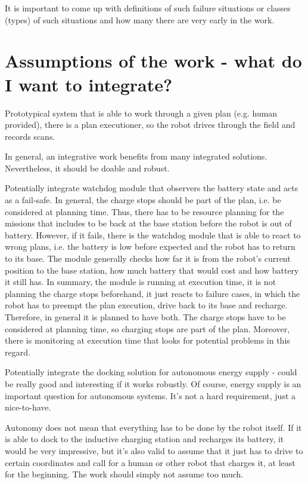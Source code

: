 \documentclass[german, master, expose, latin1]{base/thesis_KBS}
\begin{document}
It is important to come up with definitions of such failure situations or classes (types) of such situations and how many there are very early in the work.

\section{Assumptions of the work - what do I want to integrate?}

Prototypical system that is able to work through a given plan (e.g. human provided), there is a plan executioner, so the robot drives through the field and records scans.\newline

In general, an integrative work benefits from many integrated solutions. Nevertheless, it should be doable and robust.\newline

Potentially integrate watchdog module that observers the battery state and acts as a fail-safe. In general, the charge stops should be part of the plan,
i.e. be considered at planning time. Thus, there has to be resource planning for the missions that includes to be back at the base station before the robot is out of battery.
However, if it fails, there is the watchdog module that is able to react to wrong plans, i.e. the battery is low before expected and the robot has to return to its base.
The module generally checks how far it is from the robot's current position to the base station, how much battery that would cost and how battery it still has.
In summary, the module is running at execution time, it is not planning the charge stops beforehand, it just reacts to failure cases, in which the robot has to preempt
the plan execution, drive back to its base and recharge. Therefore, in general it is planned to have both. The charge stops have to be considered at planning time,
so charging stops are part of the plan. Moreover, there is monitoring at execution time that looks for potential problems in this regard.\newline

Potentially integrate the docking solution for autonomous energy supply - could be really good and interesting if it works robustly.
Of course, energy supply is an important question for autonomous systems. It's not a hard requirement, just a nice-to-have.\newline

Autonomy does not mean that everything has to be done by the robot itself. If it is able to dock to the inductive charging station and recharges its battery,
it would be very impressive, but it's also valid to assume that it just has to drive to certain coordinates and call for a human or other robot that charges it,
at least for the beginning. The work should simply not assume too much.\newline
\end{document}
